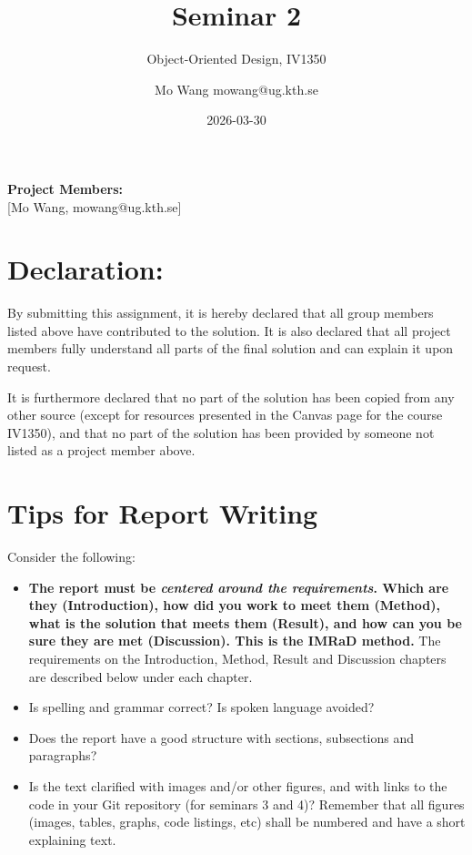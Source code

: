 \documentclass[a4paper]{scrartcl}
\title{Seminar 2}
\subtitle{Object-Oriented Design, IV1350}
\author{Mo Wang mowang@ug.kth.se}
\date{2026-03-30}
\begin{document}
\maketitle
\noindent\textbf{Project Members:} \\ \hfill
[Mo Wang, mowang@ug.kth.se]

\section*{Declaration:}

By submitting this assignment, it is hereby declared that all group members listed above have contributed to the solution. It is also declared that all project members fully understand all parts of the final solution and can explain it upon request.

It is furthermore declared that no part of the solution has been copied from any other source (except for resources presented in the Canvas page for the course IV1350), and that no part of the solution has been provided by someone not listed as a project member above.

\section*{Tips for Report Writing}

Consider the following:

\begin{itemize}
  \item \textbf{The report must be \textit{centered around the requirements}. Which are they (Introduction), how did you work to meet them (Method), what is the solution that meets them (Result), and how can you be sure they are met (Discussion). This is the IMRaD method.} The requirements on the Introduction, Method, Result and Discussion chapters are described below under each chapter.

  \item Is spelling and grammar correct? Is spoken language avoided?

  \item Does the report have a good structure with sections, subsections and paragraphs?

      \item Is the text clarified with images and/or other figures, and with links to the code in your Git repository (for seminars 3 and 4)? Remember that all figures (images, tables, graphs, code listings, etc) shall be numbered and have a short explaining text.
\end{itemize}
\end{document}
